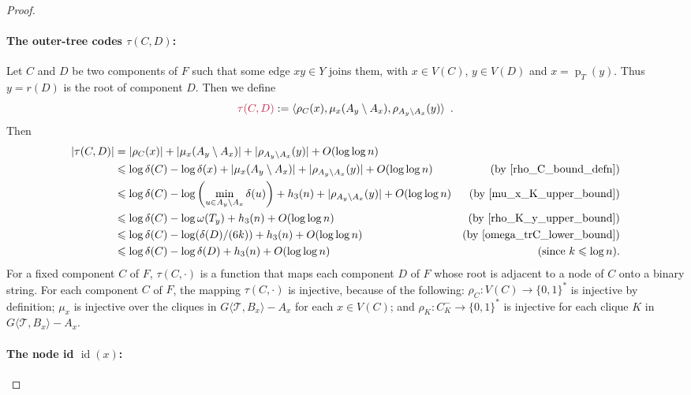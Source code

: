 \documentclass{patmorin}
\makeatletter
\renewcommand{\le}{\leqslant}
\DeclareMathOperator{\id}{id}
\def\mathcolor#1#{\@mathcolor{#1}}
\def\@mathcolor#1#2#3{%
  \protect\leavevmode
  \begingroup
    \color#1{#2}#3%
  \endgroup
}
\newcommand{\mathdefin}[1]{\mathcolor{brightmaroon}{#1}}
\newcommand{\torso}[2]{{#1}\langle{#2}\rangle}
\DeclareMathOperator{\parent}{p}
\newcommand{\Oh}{O}
\newcommand{\calT}{\mathcal{T}}
\makeatother
\begin{document}
\begin{proof}
  \paragraph{\boldmath The outer-tree codes $\tau(C,D)$:}
  Let $C$ and $D$ be two components of $F$ such that some edge $xy\in Y$ joins them, with $x\in V(C)$, $y\in V(D)$ and $x=\parent_T(y)$. Thus $y=r(D)$ is the root of component $D$. Then we define
  \[
     \mathdefin{\tau(C,D)}:= \langle\rho_C(x), \mu_x(A_y\setminus A_x), \rho_{A_y\setminus A_x}(y)\rangle \enspace .
  \]
  Then
  \begin{align}
    |\tau(C,D)|
      & = |\rho_C(x)| + |\mu_x(A_y\setminus A_x)| + |\rho_{A_y\setminus A_x}(y)| + \Oh(\log\log n) \nonumber \\
    & \le \log\delta(C) - \log\delta(x) + |\mu_x(A_y\setminus A_x)| + |\rho_{A_y\setminus A_x}(y)| + \Oh(\log\log n) 
      & \text{(by \cref{rho_C_bound_defn})} \nonumber \\
    &  \le \log\delta(C) - \log\left(\min_{u\in A_y\setminus A_x}\delta(u)\right) + h_3(n) + |\rho_{A_y\setminus A_x}(y)| + \Oh(\log\log n) 
      & \text{(by \cref{mu_x_K_upper_bound})} \nonumber \\
    & \le \log\delta(C) - \log\omega(T_y) + h_3(n) + \Oh(\log\log n)   
      & \text{(by \cref{rho_K_y_upper_bound})} \nonumber \\
    & \le \log\delta(C) - \log(\delta(D)/(6k)) + h_3(n) + \Oh(\log\log n)   
      & \text{(by \cref{omega_trC_lower_bound})} \nonumber \\
    & \le \log\delta(C) - \log\delta(D) + h_3(n) + \Oh(\log\log n) 
      & \text{\hspace{-1in}(since $k\le\log n$)}. \label{tau_upper_bound}
    \end{align}
    For a fixed component $C$ of $F$, $\tau(C,\cdot)$ is a function that maps each component $D$ of $F$ whose root is adjacent to a node of $C$ onto a binary string.  For each component $C$ of $F$, the mapping $\tau(C,\cdot)$ is injective, because of the following: $\rho_C:V(C)\to\{0,1\}^*$ is injective by definition; $\mu_{x}$ is injective over the cliques in $\torso{G}{\calT,B_x}-A_x$ for each $x\in V(C)$; and $\rho_{K}:C^-_K\to\{0,1\}^*$ is injective for each clique $K$ in $\torso{G}{\calT,B_x}-A_x$.

  \paragraph{\boldmath The node id $\id(x)$:}


\end{proof}
\end{document}
